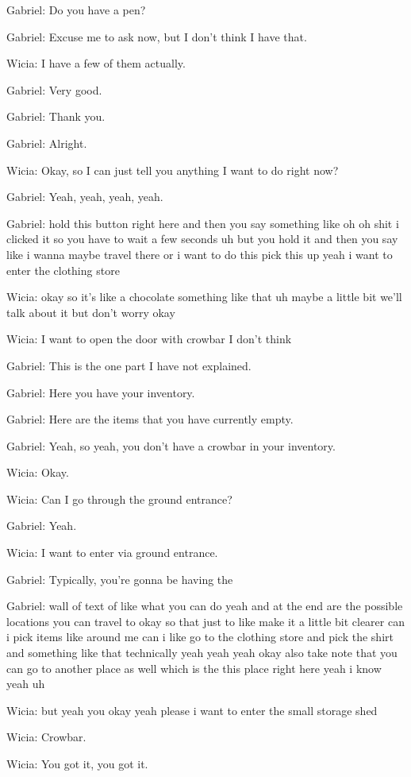Gabriel: Do you have a pen?

Gabriel: Excuse me to ask now, but I don't think I have that.

Wicia: I have a few of them actually.

Gabriel: Very good.

Gabriel: Thank you.

Gabriel: Alright.

Wicia: Okay, so I can just tell you anything I want to do right now?

Gabriel: Yeah, yeah, yeah, yeah.

Gabriel: hold this button right here and then you say something like oh oh shit i clicked it so you have to wait a few seconds uh but you hold it and then you say like i wanna maybe travel there or i want to do this pick this up yeah i want to enter the clothing store

Wicia: okay so it's like a chocolate something like that uh maybe a little bit we'll talk about it but don't worry okay

Wicia: I want to open the door with crowbar I don't think

Gabriel: This is the one part I have not explained.

Gabriel: Here you have your inventory.

Gabriel: Here are the items that you have currently empty.

Gabriel: Yeah, so yeah, you don't have a crowbar in your inventory.

Wicia: Okay.

Wicia: Can I go through the ground entrance?

Gabriel: Yeah.

Wicia: I want to enter via ground entrance.

Gabriel: Typically, you're gonna be having the

Gabriel: wall of text of like what you can do yeah and at the end are the possible locations you can travel to okay so that just to like make it a little bit clearer can i pick items like around me can i like go to the clothing store and pick the shirt and something like that technically yeah yeah yeah okay also take note that you can go to another place as well which is the this place right here yeah i know yeah uh

Wicia: but yeah you okay yeah please i want to enter the small storage shed

Wicia: Crowbar.

Wicia: You got it, you got it.

